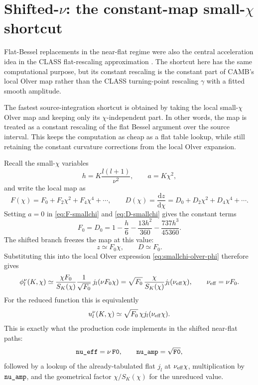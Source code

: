\documentclass[11pt,a4paper]{article}
\newcommand{\dd}{\mathrm{d}}
\newcommand{\code}[1]{\texttt{\detokenize{#1}}}
\newcommand{\SK}{S_K}
\begin{document}
\section{Shifted-\texorpdfstring{\(\nu\)}{nu}: the constant-map small-\texorpdfstring{\(\chi\)}{chi} shortcut}

Flat-Bessel replacements in the near-flat regime were also the central acceleration idea in the \textsc{CLASS} flat-rescaling approximation \cite{lesgourgues-tram2013}.  The shortcut here has the same computational purpose, but its constant rescaling is the constant part of CAMB's local Olver map rather than the \textsc{CLASS} turning-point rescaling \(\gamma\) with a fitted smooth amplitude.

The fastest source-integration shortcut is obtained by taking the local
small-\(\chi\) Olver map and keeping only its \(\chi\)-independent part.  In
other words, the map is treated as a constant rescaling of the flat Bessel
argument over the source interval.  This keeps the computation as cheap as a
flat table lookup, while still retaining the constant curvature corrections
from the local Olver expansion.

Recall the small-\(\chi\) variables
\begin{equation}
  h=K\frac{l(l+1)}{\nu^2},\qquad a=K\chi^2,
\end{equation}
and write the local map as
\begin{equation}
  F(\chi)=F_0+F_2\chi^2+F_4\chi^4+\cdots,\qquad
  D(\chi)=\frac{\dd z}{\dd\chi}=D_0+D_2\chi^2+D_4\chi^4+\cdots.
\end{equation}
Setting \(a=0\) in \eqref{eq:F-smallchi} and \eqref{eq:D-smallchi} gives the
constant terms
\begin{equation}
  F_0=D_0
  =1-\frac{h}{6}-\frac{13h^2}{360}-\frac{737h^3}{45360}.
  \label{eq:F0-shift}
\end{equation}
The shifted branch freezes the map at this value:
\begin{equation}
  z\simeq F_0\chi,\qquad D\simeq F_0.
\end{equation}
Substituting this into the local Olver expression \eqref{eq:smallchi-olver-phi}
therefore gives
\begin{equation}
  \phi_l^\nu(K,\chi)\simeq
  \frac{\chi F_0}{\SK(\chi)}\frac{1}{\sqrt{F_0}}\,
  j_l(\nu F_0\chi)
  =
  \sqrt{F_0}\,\frac{\chi}{\SK(\chi)}j_l(\nu_{\rm eff}\chi),
  \qquad \nu_{\rm eff}=\nu F_0.
  \label{eq:shifted-nu}
\end{equation}
For the reduced function this is equivalently
\begin{equation}
  u_l^\nu(K,\chi)\simeq \sqrt{F_0}\,\chi j_l(\nu_{\rm eff}\chi).
\end{equation}
This is exactly what the production code implements in the shifted near-flat
paths:
\begin{equation}
  \code{nu_eff}=\nu\,\code{F0},\qquad
  \code{nu_amp}=\sqrt{\code{F0}},
\end{equation}
followed by a lookup of the already-tabulated flat \(j_l\) at
\(\nu_{\rm eff}\chi\), multiplication by \(\code{nu_amp}\), and the geometrical
factor \(\chi/\SK(\chi)\) for the unreduced value.
\end{document}
